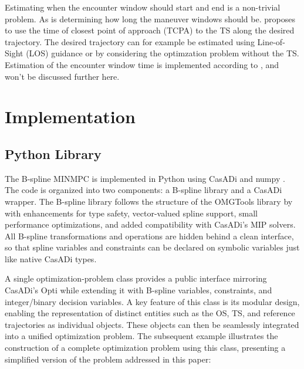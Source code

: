 Estimating when the encounter window should start and end is a non-trivial problem. As is determining how long the maneuver windows should be. \cite{Thyri2022-MPC} proposes to use the time of closest point of approach (TCPA) to the TS along the desired trajectory. The desired trajectory can for example be estimated using Line-of-Sight (LOS) guidance \citep{Fossen2011-Handbook} or by considering the optimzation problem without the TS. Estimation of the encounter window time is implemented according to \cite{Thyri2022-MPC}, and won't be discussed further here.


\section{Implementation}\label{sec:implementation}

\subsection{Python Library}\label{sec:python-implementation}

The B-spline MINMPC is implemented in Python using CasADi \citep{casadi} and numpy \citep{numpy}. The code is organized into two components: a B-spline library and a CasADi wrapper. The B-spline library follows the structure of the OMGTools library by \citet{mercy2016spline} with enhancements for type safety, vector-valued spline support, small performance optimizations, and added compatibility with CasADi’s MIP solvers. All B-spline transformations and operations are hidden behind a clean interface, so that spline variables and constraints can be declared on symbolic variables just like native CasADi types.

A single optimization-problem class provides a public interface mirroring CasADi’s Opti while extending it with B-spline variables, constraints, and integer/binary decision variables. 
A key feature of this class is its modular design, enabling the representation of distinct entities such as the OS, TS, and reference trajectories as individual objects. These objects can then be seamlessly integrated into a unified optimization problem.  The subsequent example illustrates the construction of a complete optimization problem using this class, presenting a simplified version of the problem addressed in this paper:

